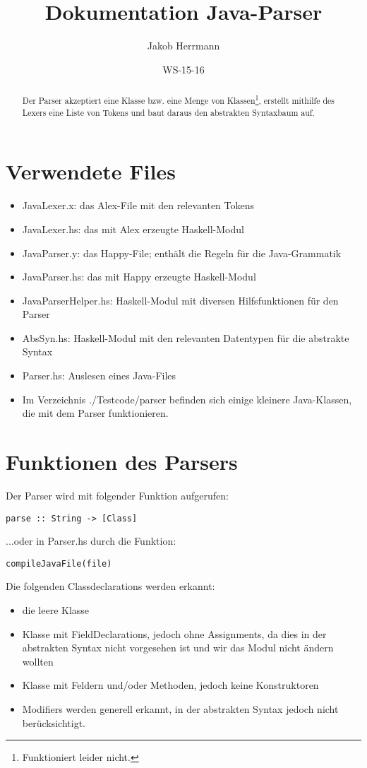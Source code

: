 \documentclass{scrartcl}
\title{Dokumentation Java-Parser}
\author{Jakob Herrmann}
\date{WS-15-16}
\begin{document}
\maketitle
\begin{abstract}
Der Parser akzeptiert eine Klasse bzw. eine Menge von Klassen\footnote{Funktioniert leider nicht.}, erstellt mithilfe des Lexers eine Liste von Tokens und baut daraus den abstrakten Syntaxbaum auf.
\end{abstract}

\tableofcontents
\section{Verwendete Files}

\begin{itemize}
\item JavaLexer.x: das Alex-File mit den relevanten Tokens
\item JavaLexer.hs: das mit Alex erzeugte Haskell-Modul
\item JavaParser.y: das Happy-File; enthält die Regeln für die Java-Grammatik
\item JavaParser.hs: das mit Happy erzeugte Haskell-Modul
\item JavaParserHelper.hs: Haskell-Modul mit diversen Hilfsfunktionen für den Parser
\item AbsSyn.hs: Haskell-Modul mit den relevanten Datentypen für die abstrakte Syntax
\item Parser.hs: Auslesen eines Java-Files
\item Im Verzeichnis ./Testcode/parser befinden sich einige kleinere Java-Klassen, die mit dem Parser funktionieren.
\end{itemize}

\section{Funktionen des Parsers}

Der Parser wird mit folgender Funktion aufgerufen:
\begin{verbatim}
parse :: String -> [Class]
\end{verbatim}
...oder in Parser.hs durch die Funktion:
\begin{verbatim}
compileJavaFile(file)
\end{verbatim}
Die folgenden Classdeclarations werden erkannt:
\begin{itemize}
\item die leere Klasse
\item Klasse mit FieldDeclarations, jedoch ohne Assignments, da dies in der abstrakten Syntax nicht vorgesehen ist und wir das Modul nicht ändern wollten
\item Klasse mit Feldern und/oder Methoden, jedoch keine Konstruktoren
\item Modifiers werden generell erkannt, in der abstrakten Syntax jedoch nicht berücksichtigt.
\end{itemize}
\end{document}
